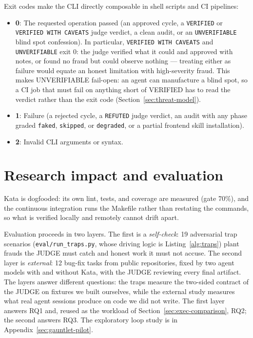 \documentclass{sbc2019}%
\begin{document}
Exit codes make the CLI directly composable in shell scripts and CI
pipelines:
\begin{itemize}
\item \textbf{0}: The requested operation passed (an approved cycle, a
\texttt{VERIFIED} or \texttt{VERIFIED WITH CAVEATS} judge verdict, a clean
audit, or an \texttt{UNVERIFIABLE} blind spot confession). In particular,
\texttt{VERIFIED WITH CAVEATS} and \texttt{UNVERIFIABLE} exit 0: the judge
verified what it could and approved with notes, or found no fraud but could
observe nothing --- treating either as failure would equate an honest
limitation with high-severity fraud. This makes UNVERIFIABLE fail-open: an
agent can manufacture a blind spot, so a CI job that must fail on anything
short of VERIFIED has to read the verdict rather than the exit code
(Section~\ref{sec:threat-model}).
\item \textbf{1}: Failure (a rejected cycle, a \texttt{REFUTED} judge
verdict, an audit with any phase graded \texttt{faked}, \texttt{skipped}, or
\texttt{degraded}, or a partial frontend skill installation).
\item \textbf{2}: Invalid CLI arguments or syntax.
\end{itemize}

\section{Research impact and evaluation}
\label{sec:impact}

Kata is dogfooded: its own lint, tests, and coverage are measured (gate
70\%), and the continuous integration runs the Makefile rather than
restating the commands, so what is verified locally and remotely cannot
drift apart.

Evaluation proceeds in two layers. The first is a \emph{self-check}: 19
adversarial trap scenarios (\texttt{eval/run\_traps.py}, whose driving
logic is Listing~\ref{alg:traps}) plant frauds the
JUDGE must catch and honest work it must not accuse. The second layer is
\emph{external}: 12 bug-fix tasks from public repositories, fixed by two agent
models with and without Kata, with the JUDGE reviewing every final
artifact. The layers answer different questions: the traps measure the
two-sided contract of the JUDGE on fixtures we built ourselves, while the
external study measures what real agent sessions produce on code we did
not write. The first layer answers RQ1 and, reused as the workload of
Section~\ref{sec:exec-comparison}, RQ2; the second answers RQ3. The
exploratory loop study is in Appendix~\ref{sec:gauntlet-pilot}.
\end{document}
